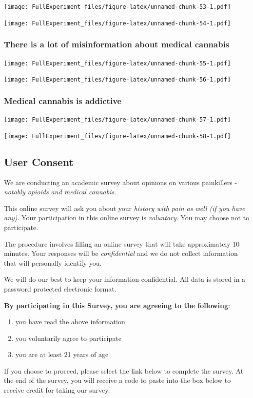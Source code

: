 \documentclass[
]{article}
\providecommand{\tightlist}{%
  \setlength{\itemsep}{0pt}\setlength{\parskip}{0pt}}
\begin{document}
\texttt{[image: FullExperiment\_files/figure-latex/unnamed-chunk-53-1.pdf]}

\texttt{[image: FullExperiment\_files/figure-latex/unnamed-chunk-54-1.pdf]}

\hypertarget{there-is-a-lot-of-misinformation-about-medical-cannabis}{%
\subsubsection{There is a lot of misinformation about medical
cannabis}\label{there-is-a-lot-of-misinformation-about-medical-cannabis}}

\texttt{[image: FullExperiment\_files/figure-latex/unnamed-chunk-55-1.pdf]}

\texttt{[image: FullExperiment\_files/figure-latex/unnamed-chunk-56-1.pdf]}

\hypertarget{medical-cannabis-is-addictive-1}{%
\subsubsection{Medical cannabis is
addictive}\label{medical-cannabis-is-addictive-1}}

\texttt{[image: FullExperiment\_files/figure-latex/unnamed-chunk-57-1.pdf]}

\texttt{[image: FullExperiment\_files/figure-latex/unnamed-chunk-58-1.pdf]}

\hypertarget{user-consent}{%
\subsection{User Consent}\label{user-consent}}

We are conducting an academic survey about opinions on various
painkillers - \emph{notably opioids and medical cannabis}.

This online survey will ask you about your \emph{history with pain as
well (if you have any)}. Your participation in this online survey is
\emph{voluntary}. You may choose not to participate.

The procedure involves filling an online survey that will take
approximately 10 minutes. Your responses will be \emph{confidential} and
we do not collect information that will personally identify you.

We will do our best to keep your information confidential. All data is
stored in a password protected electronic format.

\textbf{By participating in this Survey, you are agreeing to the
following}:

\begin{enumerate}
\def\labelenumi{\arabic{enumi}.}
\tightlist
\item
  you have read the above information
\item
  you voluntarily agree to participate
\item
  you are at least 21 years of age
\end{enumerate}

If you choose to proceed, please select the link below to complete the
survey. At the end of the survey, you will receive a code to paste into
the box below to receive credit for taking our survey.
\end{document}
